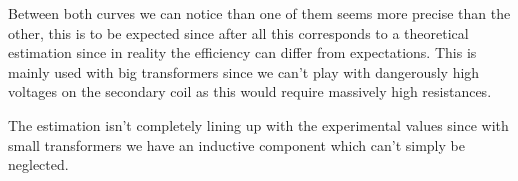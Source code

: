 \documentclass[11pt, openright]{book}
\begin{document}
Between both curves we can notice than one of them seems more precise than the other, this is to be expected since after all this corresponds to a theoretical estimation since in reality the efficiency can differ from expectations. This is mainly used with big transformers since we can't play with dangerously high voltages on the secondary coil as this would require massively high resistances. 
\newpage
\begin{figure}[ht!]
\end{figure}

The estimation isn't completely lining up with the experimental values since with small transformers we have an inductive component which can't simply be neglected.
\end{document}
